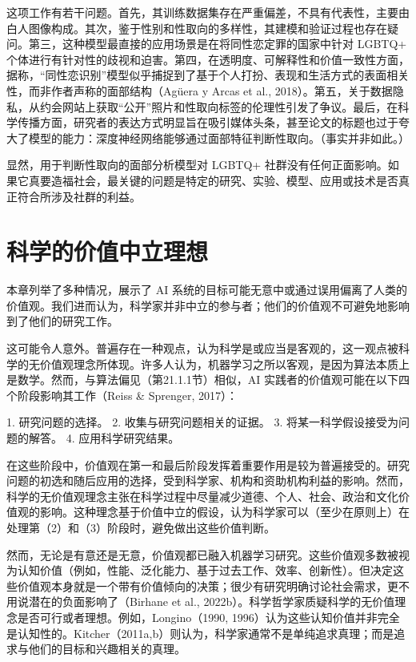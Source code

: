 这项工作有若干问题。首先，其训练数据集存在严重偏差，不具有代表性，主要由白人图像构成。其次，鉴于性别和性取向的多样性，其建模和验证过程也存在疑问。第三，这种模型最直接的应用场景是在将同性恋定罪的国家中针对 LGBTQ+ 个体进行有针对性的歧视和迫害。第四，在透明度、可解释性和价值一致性方面，据称，“同性恋识别”模型似乎捕捉到了基于个人打扮、表现和生活方式的表面相关性，而非作者声称的面部结构（Agüera y Arcas et al., 2018）。第五，关于数据隐私，从约会网站上获取“公开”照片和性取向标签的伦理性引发了争议。最后，在科学传播方面，研究者的表达方式明显旨在吸引媒体头条，甚至论文的标题也过于夸大了模型的能力：深度神经网络能够通过面部特征判断性取向。（事实并非如此。）

显然，用于判断性取向的面部分析模型对 LGBTQ+ 社群没有任何正面影响。如果它真要造福社会，最关键的问题是特定的研究、实验、模型、应用或技术是否真正符合所涉及社群的利益。

\section{科学的价值中立理想}
本章列举了多种情况，展示了 AI 系统的目标可能无意中或通过误用偏离了人类的价值观。我们进而认为，科学家并非中立的参与者；他们的价值观不可避免地影响到了他们的研究工作。

这可能令人意外。普遍存在一种观点，认为科学是或应当是客观的，这一观点被科学的无价值观理念所体现。许多人认为，机器学习之所以客观，是因为算法本质上是数学。然而，与算法偏见（第21.1.1节）相似，AI 实践者的价值观可能在以下四个阶段影响其工作（Reiss \& Sprenger, 2017）：

1. 研究问题的选择。
2. 收集与研究问题相关的证据。
3. 将某一科学假设接受为问题的解答。
4. 应用科学研究结果。

在这些阶段中，价值观在第一和最后阶段发挥着重要作用是较为普遍接受的。研究问题的初选和随后应用的选择，受到科学家、机构和资助机构利益的影响。然而，科学的无价值观理念主张在科学过程中尽量减少道德、个人、社会、政治和文化价值观的影响。这种理念基于价值中立的假设，认为科学家可以（至少在原则上）在处理第（2）和（3）阶段时，避免做出这些价值判断。

然而，无论是有意还是无意，价值观都已融入机器学习研究。这些价值观多数被视为认知价值（例如，性能、泛化能力、基于过去工作、效率、创新性）。但决定这些价值观本身就是一个带有价值倾向的决策；很少有研究明确讨论社会需求，更不用说潜在的负面影响了（Birhane et al., 2022b）。科学哲学家质疑科学的无价值理念是否可行或者理想。例如，Longino（1990, 1996）认为这些认知价值并非完全是认知性的。Kitcher（2011a,b）则认为，科学家通常不是单纯追求真理；而是追求与他们的目标和兴趣相关的真理。

